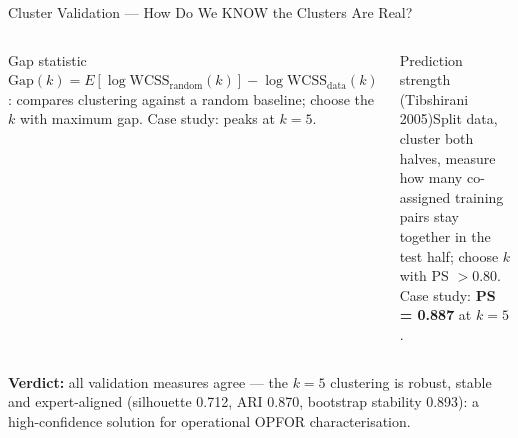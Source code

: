 \documentclass[aspectratio=169,10pt,t]{beamer}
\begin{document}
\begin{frame}{Cluster Validation --- How Do We KNOW the Clusters Are Real?}
\begin{columns}[T]
\begin{cbox}[ISSAnavy]{Gap statistic}\scriptsize $\text{Gap}(k)=E[\log\text{WCSS}_{\text{random}}(k)]-\log\text{WCSS}_{\text{data}}(k)$: compares clustering against a random baseline; choose the $k$ with maximum gap. Case study: peaks at \textbf{$k=5$}.\end{cbox}
\begin{cbox}[ISSAnavy]{Prediction strength (Tibshirani 2005)}\scriptsize Split data, cluster both halves, measure how many co-assigned training pairs stay together in the test half; choose $k$ with PS $>0.80$. Case study: \textbf{PS = 0.887} at $k=5$.\end{cbox}
\end{columns}
\begin{rbox}\scriptsize\textbf{Verdict:} all validation measures agree --- the $k=5$ clustering is robust, stable and expert-aligned (silhouette 0.712, ARI 0.870, bootstrap stability 0.893): a high-confidence solution for operational OPFOR characterisation.\end{rbox}
\end{frame}
\end{document}
